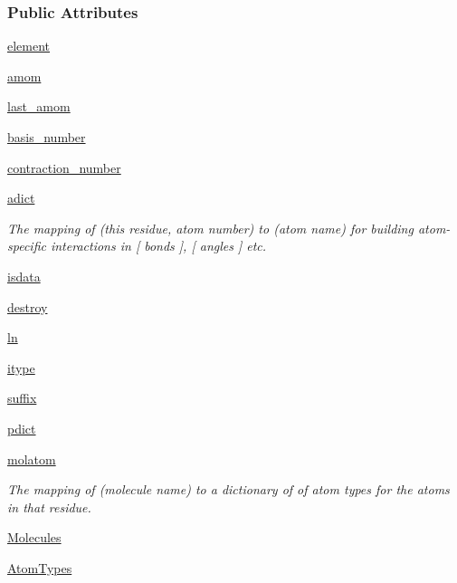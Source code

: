 \subsubsection*{\-Public \-Attributes}
\begin{DoxyCompactItemize}
\item 
\hyperlink{classforcebalance_1_1psi4io_1_1GBS__Reader_a7ae4043e34dc0ee7edc7558bb8081e1b}{element}
\item 
\hyperlink{classforcebalance_1_1psi4io_1_1GBS__Reader_a63e3817ced77c19c882858dca1511c41}{amom}
\item 
\hyperlink{classforcebalance_1_1psi4io_1_1GBS__Reader_a2f81789118aa6244a540205ce3eea92a}{last\-\_\-amom}
\item 
\hyperlink{classforcebalance_1_1psi4io_1_1GBS__Reader_aa2a7c63e9226afd1f7d6e641d401cf26}{basis\-\_\-number}
\item 
\hyperlink{classforcebalance_1_1psi4io_1_1GBS__Reader_a0abd86255911daa2c9c1b5fbbd073d02}{contraction\-\_\-number}
\item 
\hyperlink{classforcebalance_1_1psi4io_1_1GBS__Reader_aa7cbae977f7e9a4e14ba1d45f62bb5fa}{adict}
\begin{DoxyCompactList}\small\item\em \-The mapping of (this residue, atom number) to (atom name) for building atom-\/specific interactions in \mbox{[} bonds \mbox{]}, \mbox{[} angles \mbox{]} etc. \end{DoxyCompactList}\item 
\hyperlink{classforcebalance_1_1psi4io_1_1GBS__Reader_afae9acafd8d175b199da525af9f4b689}{isdata}
\item 
\hyperlink{classforcebalance_1_1psi4io_1_1GBS__Reader_a49f92a123ac138ba4b17a29c4c95bdd5}{destroy}
\item 
\hyperlink{classforcebalance_1_1BaseReader_a80c8e3bea212600742968aa8669e557b}{ln}
\item 
\hyperlink{classforcebalance_1_1BaseReader_a22ff3f4c684c728e019d801fface36f6}{itype}
\item 
\hyperlink{classforcebalance_1_1BaseReader_a48ef0584a1b6b4b6f8eb741ad8465db8}{suffix}
\item 
\hyperlink{classforcebalance_1_1BaseReader_aaf18c900d6055ed4b5124f6bb26164c1}{pdict}
\item 
\hyperlink{classforcebalance_1_1BaseReader_ab444c213e15929253dd73395ac5f19fc}{molatom}
\begin{DoxyCompactList}\small\item\em \-The mapping of (molecule name) to a dictionary of of atom types for the atoms in that residue. \end{DoxyCompactList}\item 
\hyperlink{classforcebalance_1_1BaseReader_a4369b5fb663a83b11602daa71db6862e}{\-Molecules}
\item 
\hyperlink{classforcebalance_1_1BaseReader_a69ca7d949a4a3df4d9f61e617fe0e270}{\-Atom\-Types}
\end{DoxyCompactItemize}


